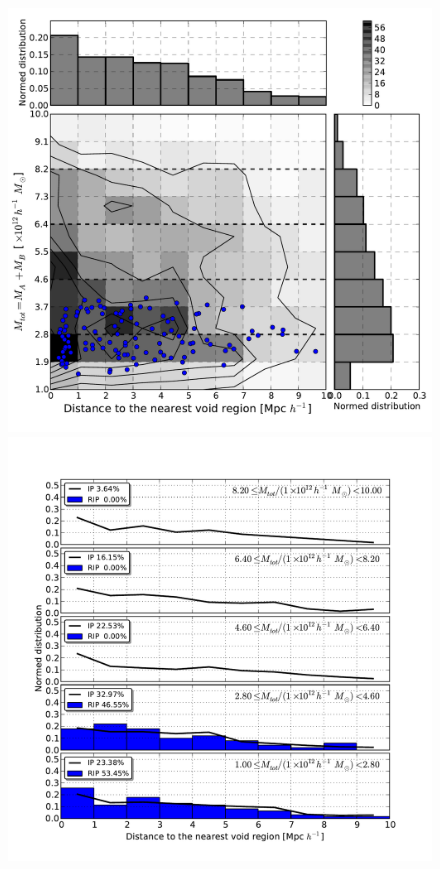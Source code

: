 \documentclass[usenatbib]{latex/mn2e}
\begin{document}
\begin{flushleft}
\begin{figure}
\begin{center}

  \includegraphics[trim = 2mm 9mm 3mm 4mm, clip, keepaspectratio=true,
  width=0.36\textheight]{./figures/2D_totalmass_vdistance_BDM_Tweb}
  \includegraphics[trim = 4mm 9mm 17mm 15mm, clip, keepaspectratio=true,
  width=0.36\textheight]{./figures/single_totalmass_vdistance_BDM_Tweb}
  

\end{center}
\end{figure}
\end{flushleft}
\end{document}
